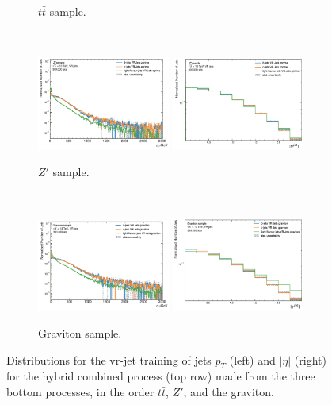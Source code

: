 \begin{figure}[h!]
\begin{subfigure}[b]{0.98\textwidth}
      \caption{$t\bar{t}$ sample.} 
      \label{fig:vrjetdistt}
  \end{subfigure}\\
  \begin{subfigure}[b]{0.98\textwidth}
      \centering
      \includegraphics[width=0.48\textwidth]{Images/FTAG/VRDips/JetDist/zppt.png}
      \includegraphics[width=0.48\textwidth]{Images/FTAG/VRDips/JetDist/zpeta.png}
      \caption{$Z'$ sample.} 
      \label{fig:vrjetdiszp}
  \end{subfigure}\\
  \begin{subfigure}[b]{0.98\textwidth}
      \centering
      \includegraphics[width=0.48\textwidth]{Images/FTAG/VRDips/JetDist/grpt.png}
      \includegraphics[width=0.48\textwidth]{Images/FTAG/VRDips/JetDist/greta.png}
      \caption{Graviton sample.} 
      \label{fig:vrjetdisgr}
  \end{subfigure}
  \caption{Distributions for the \gls{vr}-jet training of jets $p_T$ (left) and $|\eta|$ (right) for the hybrid combined process (top row) made from the three bottom processes, in the order $t\bar{t}$, $Z'$, and the graviton.}
  \label{fig:vrjetdist}
\end{figure} 
 
